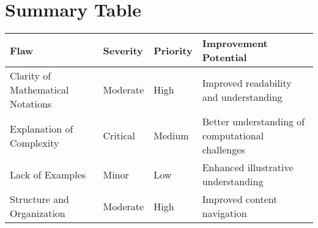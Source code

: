 \documentclass{article}
\begin{document}
\section*{Summary Table}
\begin{tabular}{| >{\raggedright}p{5cm} | >{\centering}p{2.5cm} | >{\centering}p{2.5cm} | >{\raggedright}p{4cm} |}
\hline
\textbf{Flaw} & \textbf{Severity} & \textbf{Priority} & \textbf{Improvement Potential} \\ \hline
Clarity of Mathematical Notations & Moderate & High & Improved readability and understanding \\ \hline
Explanation of Complexity & Critical & Medium & Better understanding of computational challenges \\ \hline
Lack of Examples & Minor & Low & Enhanced illustrative understanding \\ \hline
Structure and Organization & Moderate & High & Improved content navigation \\ \hline
\end{tabular}
\end{document}
